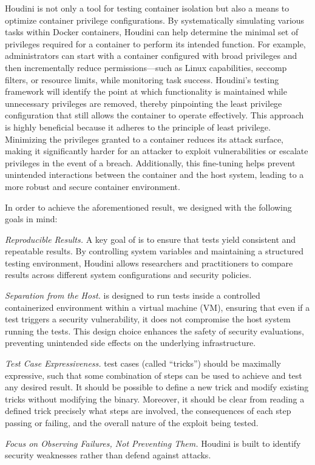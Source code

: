 Houdini is not only a tool for testing container isolation but also a means to optimize container privilege configurations. By systematically simulating various tasks within Docker containers, Houdini can help determine the minimal set of privileges required for a container to perform its intended function. For example, administrators can start with a container configured with broad privileges and then incrementally reduce permissions—such as Linux capabilities, seccomp filters, or resource limits, while monitoring task success. Houdini’s testing framework will identify the point at which functionality is maintained while unnecessary privileges are removed, thereby pinpointing the least privilege configuration that still allows the container to operate effectively. This approach is highly beneficial because it adheres to the principle of least privilege. Minimizing the privileges granted to a container reduces its attack surface, making it significantly harder for an attacker to exploit vulnerabilities or escalate privileges in the event of a breach. Additionally, this fine-tuning helps prevent unintended interactions between the container and the host system, leading to a more robust and secure container environment.

In order to achieve the aforementioned result, we designed \houdini with the following
goals in mind:
\begin{dgenum}
  \item \label{dg:repro}\textit{Reproducible Results.} A key goal of \houdini is to ensure that tests yield consistent and repeatable results. By controlling system variables and maintaining a structured testing environment, Houdini allows researchers and practitioners to compare results across different system configurations and security policies.

  \item \label{dg:container}\textit{Separation from the Host.} \houdini is designed to run tests inside a controlled containerized environment within a virtual machine (VM), ensuring that even if a test triggers a security vulnerability, it does not compromise the host system running the tests. This design choice enhances the safety of security evaluations, preventing unintended side effects on the underlying infrastructure.

  \item \label{dg:test}\textit{Test Case Expressiveness.} \houdini test cases (called
  \enquote{tricks}) should be maximally expressive, such that some combination of steps
  can be used to achieve and test any desired result. It should be possible to define
  a new \houdini trick and modify existing tricks without modifying the \houdini
  binary. Moreover, it should be clear from reading a defined trick precisely what steps
  are involved, the consequences of each step passing or failing, and the overall nature
  of the exploit being tested.

  \item \label{dg:failures}\textit{Focus on Observing Failures, Not Preventing Them.} Houdini is built to identify security weaknesses rather than defend against attacks.
\end{dgenum}

